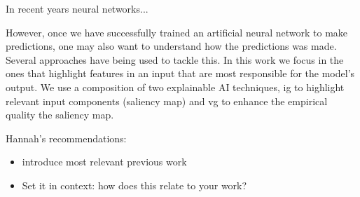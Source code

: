 In recent years neural networks...

However, once we have successfully trained an artificial neural network to make predictions, one may also want to understand how the predictions was
made. Several approaches have being used to tackle this. In this work we focus in the ones that highlight features in an input that are most responsible for the model's output. We use a composition of two explainable AI techniques, \gls{ig} \cite{sundararajan2017axiomatic} to highlight relevant input components (saliency map) and \gls{vg} \cite{adebayo2020sanity} to enhance the empirical quality the saliency map.

Hannah's recommendations:
\begin{itemize}
  \item introduce most relevant previous work
  \item Set it in context: how does this relate to your work?
\end{itemize}
